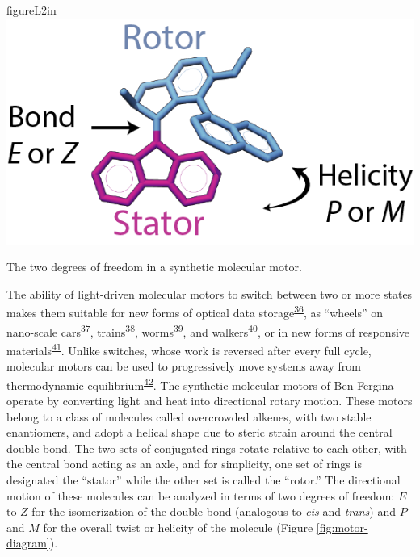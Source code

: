\documentclass[11pt,notitlepage]{article}
\begin{document}
\begin{wrapfloat}{figure}{L}{2in}
\centering
\includegraphics{content/images/motor.png}
\caption{The two degrees of freedom in a synthetic molecular motor.}
\label{fig:motor-diagram}
\end{wrapfloat}

The ability of light-driven molecular motors to switch between two or
more states makes them suitable for new forms of optical data
storage\textsuperscript{\protect\hyperlink{ref-18PGyWtWV}{36}}, as
``wheels'' on nano-scale
cars\textsuperscript{\protect\hyperlink{ref-OAnfwOYX}{37}},
trains\textsuperscript{\protect\hyperlink{ref-10MPrT2Vf}{38}},
worms\textsuperscript{\protect\hyperlink{ref-Tels98bO}{39}}, and
walkers\textsuperscript{\protect\hyperlink{ref-SfUEsk0e}{40}}, or in new
forms of responsive
materials\textsuperscript{\protect\hyperlink{ref-jCuccJLJ}{41}}. Unlike
switches, whose work is reversed after every full cycle, molecular
motors can be used to progressively move systems away from thermodynamic
equilibrium\textsuperscript{\protect\hyperlink{ref-1H5r7SBir}{42}}. The
synthetic molecular motors of Ben Fergina operate by converting light
and heat into directional rotary motion. These motors belong to a class
of molecules called overcrowded alkenes, with two stable enantiomers,
and adopt a helical shape due to steric strain around the central double
bond. The two sets of conjugated rings rotate relative to each other,
with the central bond acting as an axle, and for simplicity, one set of
rings is designated the ``stator'' while the other set is called the
``rotor.'' The directional motion of these molecules can be analyzed in
terms of two degrees of freedom: \(E\) to \(Z\) for the isomerization of
the double bond (analogous to \emph{cis} and \emph{trans}) and \(P\) and
\(M\) for the overall twist or helicity of the molecule (Figure
\ref{fig:motor-diagram}).
\end{document}

